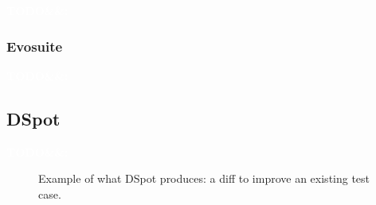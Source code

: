 \documentclass[11pt]{sdm}
\newcommand{\todo}[1]{\colorbox{Red!75}{\textcolor{white}{\textbf{TODO\ifx&#1&\else: #1\fi}}}}
\newcommand{\dspot}{DSpot\xspace}
\begin{document}
\todo{}

\subsubsection{Evosuite}
\label{evosuite}
\cite{fraser2011evosuite}
\todo{}


\subsection{DSpot}
\label{testsuite_eval}
\todo{}


\begin{figure}
  \centering
  \caption{Example of what \dspot{} produces: a diff to improve an existing test case.}
\label{fig:diff-protostuff}
\end{figure}
\end{document}

